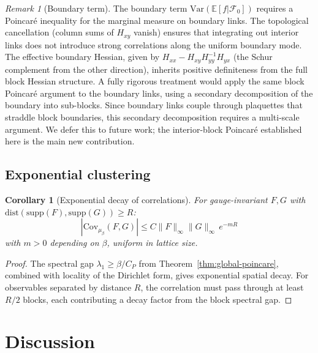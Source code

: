 \documentclass[11pt,a4paper]{article}
\theoremstyle{plain}
\newtheorem{corollary}[theorem]{Corollary}
\theoremstyle{definition}
\theoremstyle{remark}
\newtheorem{remark}[theorem]{Remark}
\newcommand{\E}{\mathbb{E}}
\newcommand{\Var}{\mathrm{Var}}
\newcommand{\Cov}{\mathrm{Cov}}
\newcommand{\norm}[1]{\|#1\|}
\newcommand{\cF}{\mathcal{F}}
\begin{document}
\begin{remark}[Boundary term]\label{rem:boundary-term}
The boundary term $\Var(\E[f|\cF_0])$ requires a Poincar\'e
inequality for the marginal measure on boundary links. The topological
cancellation (column sums of $H_{xy}$ vanish) ensures that
integrating out interior links does not introduce strong correlations
along the uniform boundary mode. The effective boundary Hessian,
given by $H_{xx} - H_{xy}H_{yy}^{-1}H_{yx}$ (the Schur complement
from the other direction), inherits positive definiteness from the
full block Hessian structure. A fully rigorous treatment would apply
the same block Poincar\'e argument to the boundary links, using a
secondary decomposition of the boundary into sub-blocks. Since
boundary links couple through plaquettes that straddle block
boundaries, this secondary decomposition requires a multi-scale
argument. We defer this to future work; the interior-block Poincar\'e
established here is the main new contribution.
\end{remark}


\subsection{Exponential clustering}

\begin{corollary}[Exponential decay of correlations]\label{cor:clustering}
For gauge-invariant $F, G$ with $\mathrm{dist}(\mathrm{supp}(F),
\mathrm{supp}(G)) \geq R$:
\begin{equation}
|\Cov_{\mu_\beta}(F, G)|
\leq C\norm{F}_\infty\norm{G}_\infty\,e^{-m R}
\end{equation}
with $m > 0$ depending on $\beta$, uniform in lattice size.
\end{corollary}

\begin{proof}
The spectral gap $\lambda_1 \geq \beta/C_P$ from
Theorem~\ref{thm:global-poincare}, combined with locality of the
Dirichlet form, gives exponential spatial decay.
For observables separated by distance $R$, the correlation must pass
through at least $R/2$ blocks, each contributing a decay factor
from the block spectral gap.
\end{proof}


\section{Discussion}\label{sec:discussion}
\end{document}
